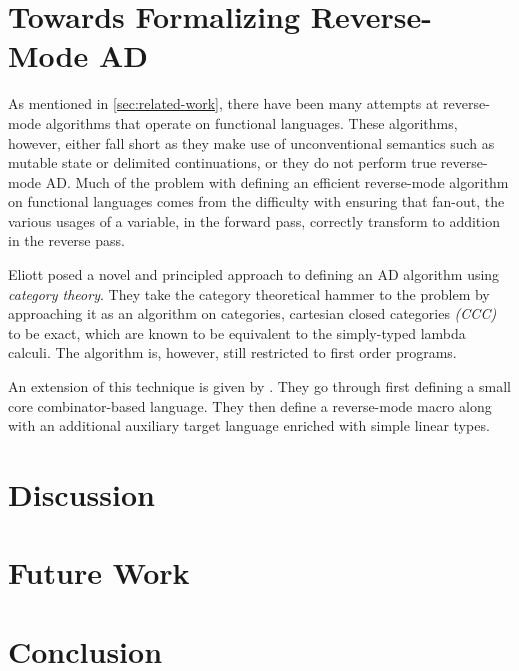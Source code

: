 \documentclass[11pt, final]{article}
\begin{document}
\section{Towards Formalizing Reverse-Mode AD}\label{sec:rev}
  As mentioned in \cref{sec:related-work}, there have been many attempts at reverse-mode algorithms that operate on functional languages.
  These algorithms, however, either fall short as they make use of unconventional semantics such as mutable state or delimited continuations, or they do not perform true reverse-mode AD.
  Much of the problem with defining an efficient reverse-mode algorithm on functional languages comes from the difficulty with ensuring that fan-out, the various usages of a variable, in the forward pass, correctly transform to addition in the reverse pass.

  Eliott posed a novel and principled approach to defining an AD algorithm using \textit{category theory}\cite{Elliott-2018-ad-icfp}.
  They take the category theoretical hammer to the problem by approaching it as an algorithm on categories, cartesian closed categories \textit{(CCC)} to be exact, which are known to be equivalent to the simply-typed lambda calculi\cite{Elliott-2017-compiling-to-categories}\cite{10.1007/3-540-15198-2_10}.
  The algorithm is, however, still restricted to first order programs.

  An extension of this technique is given by \Vakar{}\cite{vkr2020reverse}.
  They go through first defining a small core combinator-based language.
  They then define a reverse-mode macro along with an additional auxiliary target language enriched with simple linear types.
  
  
  
\section{Discussion}
  
\section{Future Work}
  
\section{Conclusion}
  

\clearpage
\printbibliography
\makeatother
\end{document}

